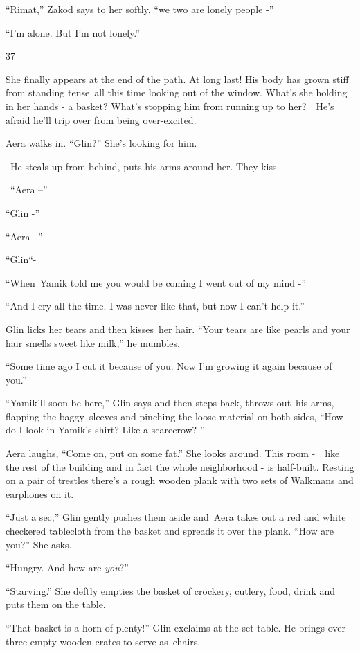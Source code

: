 \documentclass[twoside,11pt]{book}
\begin{document}
``Rimat,'' Zakod says to her softly, ``we two are lonely people -''

``I'm alone. But I'm not lonely.''


\bigskip

37 \ 

She finally appears at the end of the path. At long last! His body has grown stiff from standing
tense{\ }all this time looking out of the window. What's she holding in her
hands - a basket? What's stopping him from running up to her?\ \ He's afraid he'll trip over from being over-excited.\ 

Aera walks in. ``Glin?'' She's looking for him.

~He steals up from behind, puts his arms around her. They kiss.

~``Aera --'' 

``Glin -'' 

``Aera --'' 

``Glin``- 

``When\ Yamik told me you would be coming I went out of my mind {}-'' 

``And I cry all the time. I was never like that, but now I can't help it.'' 

Glin licks her tears and then kisses\ her hair. ``Your tears are like pearls and your hair smells sweet
like milk,'' he mumbles.\ 

``Some time ago I cut it because of you. Now I'm growing it again because of you.'' 

``Yamik'll soon be here,'' Glin says and then steps back, throws
out{\ }his arms, flapping the baggy~sleeves and pinching the loose material on
both sides, ``How do I look in Yamik's shirt? Like a scarecrow? '' 

Aera laughs, ``Come on, put on some fat.'' She looks around. This room -\ \ like the rest of
the building and in fact the whole neighborhood - is half{{}-}built. Resting on
a pair of trestles there's a rough wooden plank with two sets of Walkmans and earphones on it. 

``Just a sec,'' Glin gently pushes them aside and\ Aera takes out a red and white checkered
tablecloth from the basket and spreads it over the plank. ``How are you?'' She asks.\ 

``Hungry. And how are \textit{you}?'' 

``Starving.'' She deftly empties the basket of crockery, cutlery, food, drink and puts them on
the table. 

``That basket is a horn of plenty!'' Glin exclaims at the set table. He brings over three
empty wooden crates to serve as\ chairs.\ 
\end{document}
